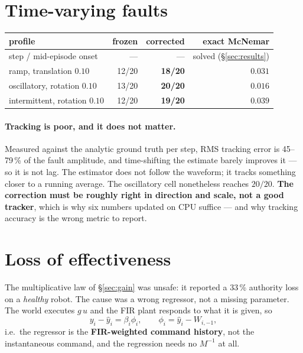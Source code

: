 \documentclass[11pt,a4paper]{article}
\begin{document}
\section{Time-varying faults}
\label{sec:timevarying}

\begin{center}
\begin{tabular}{lrrr}
\toprule
profile & frozen & corrected & exact McNemar \\
\midrule
step / mid-episode onset & --- & --- & solved (\S\ref{sec:results}) \\
ramp, translation $0.10$ & 12/20 & \textbf{18/20} & $\mathbf{0.031}$ \\
oscillatory, rotation $0.10$ & 13/20 & \textbf{20/20} & $\mathbf{0.016}$ \\
intermittent, rotation $0.10$ & 12/20 & \textbf{19/20} & $\mathbf{0.039}$ \\
\bottomrule
\end{tabular}
\end{center}

\paragraph{Tracking is poor, and it does not matter.}
Measured against the analytic ground truth per step, RMS tracking error is 45--79\,\% of the
fault amplitude, and time-shifting the estimate barely improves it --- so it is not lag. The
estimator does not follow the waveform; it tracks something closer to a running average. The
oscillatory cell nonetheless reaches $20/20$. \textbf{The correction must be roughly right in
direction and scale, not a good tracker}, which is why six numbers updated on CPU suffice ---
and why tracking accuracy is the wrong metric to report.

\section{Loss of effectiveness}
\label{sec:gainsolved}

The multiplicative law of \S\ref{sec:gain} was unsafe: it reported a 33\,\% authority loss on
a \emph{healthy} robot. The cause was a wrong regressor, not a missing parameter. The world
executes $g\,u$ and the FIR plant responds to what it is given, so
%
\begin{equation}
y_i - \hat y_i = \beta_i \phi_i, \qquad \phi_i = \hat y_i - W_{i,-1},
\end{equation}
%
i.e.\ the regressor is the \textbf{FIR-weighted command history}, not the instantaneous
command, and the regression needs no $M^{-1}$ at all.
\end{document}
